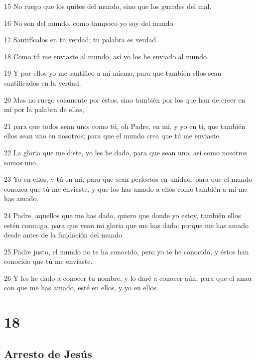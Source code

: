 \par 15 No ruego que los quites del mundo, sino que los guardes del mal.
\par 16 No son del mundo, como tampoco yo soy del mundo.
\par 17 Santifícalos en tu verdad; tu palabra es verdad.
\par 18 Como tú me enviaste al mundo, así yo los he enviado al mundo.
\par 19 Y por ellos yo me santifico a mí mismo, para que también ellos sean santificados en la verdad.
\par 20 Mas no ruego solamente por éstos, sino también por los que han de creer en mí por la palabra de ellos,
\par 21 para que todos sean uno; como tú, oh Padre, en mí, y yo en ti, que también ellos sean uno en nosotros; para que el mundo crea que tú me enviaste.
\par 22 La gloria que me diste, yo les he dado, para que sean uno, así como nosotros somos uno.
\par 23 Yo en ellos, y tú en mí, para que sean perfectos en unidad, para que el mundo conozca que tú me enviaste, y que los has amado a ellos como también a mí me has amado.
\par 24 Padre, aquellos que me has dado, quiero que donde yo estoy, también ellos estén conmigo, para que vean mi gloria que me has dado; porque me has amado desde antes de la fundación del mundo.
\par 25 Padre justo, el mundo no te ha conocido, pero yo te he conocido, y éstos han conocido que tú me enviaste.
\par 26 Y les he dado a conocer tu nombre, y lo daré a conocer aún, para que el amor con que me has amado, esté en ellos, y yo en ellos.

\chapter{18}

\section*{Arresto de Jesús}

